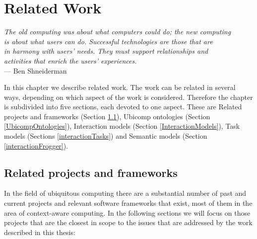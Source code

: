 \chapter{Related Work}

\begin{flushright}{\slshape
The old computing was about what computers could do; the new computing \\
is about what users can do. Successful technologies are those that are\\
in harmony with users' needs. They must support relationships and \\
activities that enrich the users' experiences. } \\ \medskip
	    --- Ben Shneiderman
	\end{flushright}

In this chapter we describe related work. The work can be related in several ways, depending on which aspect of the work is considered. Therefore the chapter is subdivided into five sections, each devoted to one aspect. These are Related projects and frameworks (Section \ref{RelatedProjects}), Ubicomp ontologies (Section \ref{UbicompOntologies}), Interaction models (Section \ref{InteractionModels}), Task models (Sections \ref{interactionTasks}) and Semantic models (Section \ref{interactionFrogger}).






\section{Related projects and frameworks}
\label{RelatedProjects}
% 
% 

In the field of ubiquitous computing there are a substantial number of past and current projects and relevant software frameworks that exist, most of them in the area of context-aware computing. In the following sections we will focus on those projects that are the closest in scope to the issues that are addressed by the work described in this thesis:

